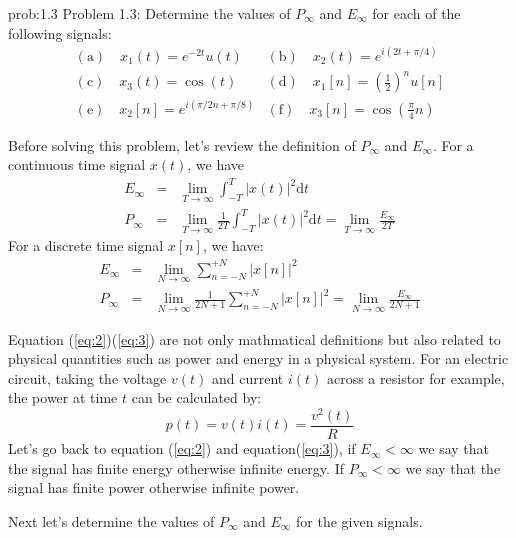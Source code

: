 \documentclass[koma,a4paper,utopia,12pt,listings-color,microtype,paralist,colorlinks,urlcolor=red]{org-article}
\begin{document}
\begin{prob}[]{prob:1.3}
Problem 1.3: Determine the values of \(P_{\infty}\) and \(E_{\infty}\) for each
of the following signals:
\begin{equation*}
\begin{array}{ll}
\mathrm{(a)} \quad x_{1}(t) = e^{-2t}u(t) & \mathrm{(b)} \quad x_{2}(t) = e^{i(2t + \pi/4)} \\
 \mathrm{(c)} \quad x_{3}(t) = \cos(t) & \mathrm{(d)} \quad x_{1}[n] = (\tfrac{1}{2})^{n} u[n] \\
 \mathrm{( e )} \quad x_{2}[n] = e^{i(\pi/2n + \pi/8)} & \mathrm{(f)} \quad x_{3}[n] = \cos(\tfrac{\pi}{4}n)
\end{array}
\end{equation*}
\label{prob13}
\end{prob}

Before solving this problem, let's review the definition of \(P_{\infty}\) and
\(E_{\infty}\). For a continuous time signal \(x(t)\), we have
\begin{eqnarray}
\label{eq:2}
E_{\infty}&=& \lim_{T\to \infty} \int_{-T}^{T} |x(t)|^{2}\mathrm{d}t \\
P_{\infty}&=& \lim_{T\to \infty} \frac{1}{2T}\int_{-T}^{T} |x(t)|^{2}\mathrm{d}t = \lim_{T\to\infty} \frac{E_{\infty}}{2T}
\end{eqnarray}
For a discrete time signal \(x[n]\), we have:
\begin{eqnarray}
\label{eq:3}
E_{\infty}&=& \lim_{N\to \infty} \sum_{n=-N}^{+N} |x[n]|^{2} \\
P_{\infty}&=& \lim_{N\to \infty} \frac{1}{2N+1} \sum_{n=-N}^{+N} |x[n]|^{2} = \lim_{N\to\infty} \frac{E_{\infty}}{2N+1}
\end{eqnarray}

Equation (\ref{eq:2})(\ref{eq:3}) are not only mathmatical definitions but also
related to physical quantities such as power and energy in a physical system.
For an electric circuit, taking the voltage \(v(t)\) and current \(i(t)\) across
a resistor for example, the power at time \(t\) can be calculated by:
\begin{equation}
\label{eq:4}
p(t) = v(t)i(t) = \frac{v^{2}(t)}{R}
\end{equation}
Let's go back to equation (\ref{eq:2}) and equation(\ref{eq:3}), if
\(E_{\infty}< \infty\) we say that the signal has finite energy otherwise
infinite energy. If \(P_{\infty} <\infty\) we say that the signal has finite
power otherwise infinite power.

Next let's determine the values of \(P_{\infty}\) and \(E_{\infty}\) for the
given signals.
\end{document}
